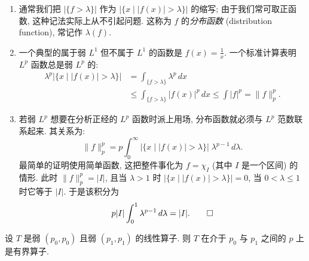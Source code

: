 \begin{remark}\label{rem:1.20}
\begin{enumerate}[label=\alph*)]
\item 通常我们把 $|\{f>\lambda\}|$ 作为 $|\{x \mid |f(x)|>\lambda\}|$ 的缩写; 由于我们常可取正函数, 这种记法实际上从不引起问题. 这称为 $f$ 的\emph{分布函数} (distribution function), 常记作 $\lambda(f)$.
\item 一个典型的属于弱 $L^1$ 但不属于 $L^1$ 的函数是 $f(x)=\frac{1}{x}$. 一个标准计算表明 $L^p$ 函数总是弱 $L^p$ 的:
\begin{align*}
\lambda^p|\{x \mid |f(x)|>\lambda\}|&=\int_{\{f>\lambda\}}\lambda^p\,dx \\
&\leq\int_{\{f>\lambda\}}|f(x)|^p\,dx\leq\int|f|^p=\|f\|_p^p.
\end{align*}
\item 若弱 $L^p$ 想要在分析正经的 $L^p$ 函数时派上用场, 分布函数就必须与 $L^p$ 范数联系起来. 其关系为:
\[
\|f\|_p^p=p\int_0^{\infty}|\{x \mid |f(x)|>\lambda\}|\;\lambda^{p-1}\,d\lambda.
\]
最简单的证明使用简单函数, 这把整件事化为 $f=\chi_I$ (其中 $I$ 是一个区间) 的情形. 此时 $\|f\|_p^p=|I|$, 且当 $\lambda>1$ 时 $|\{x \mid |f(x)|>\lambda\}|=0$, 当 $0<\lambda\leq 1$ 时它等于 $|I|$. 于是该积分为
\[
p|I|\int_0^1\lambda^{p-1}\,d\lambda=|I|. \qedhere
\]
\end{enumerate}
\end{remark}

\begin{theorem}\label{thm:1.21}
设 $T$ 是弱 $(p_0,p_0)$ 且弱 $(p_1,p_1)$ 的线性算子. 则 $T$ 在介于 $p_0$ 与 $p_1$ 之间的 $p$ 上是有界算子.
\end{theorem}

